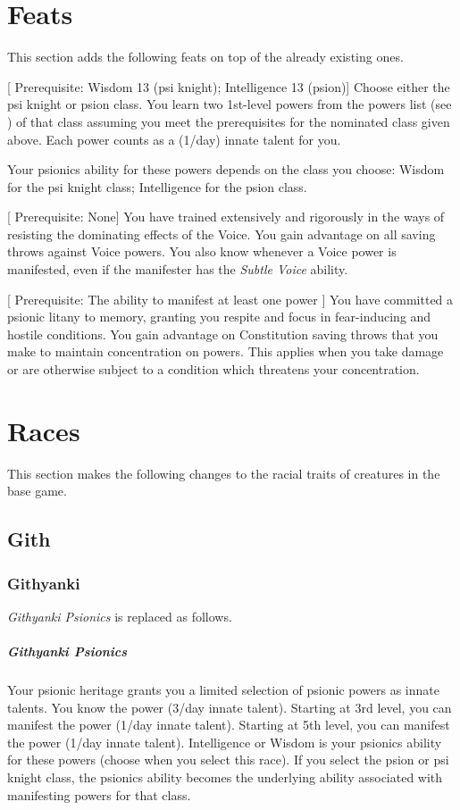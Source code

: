 \section{Feats}
\label{sec:feats}
This section adds the following feats on top of the already
existing ones.

[%
    Prerequisite: Wisdom 13 (psi knight); Intelligence 13 (psion)]
    Choose either the psi knight or psion class.
    You learn two 1st-level powers from the powers list
    (see )
    of that class assuming you meet the prerequisites
    for the nominated class given above.
    Each power counts as a (1/day) innate talent for you.

    Your psionics ability for these powers depends on the class
    you choose:
    Wisdom for the psi knight class; Intelligence for the psion class.

[%
    Prerequisite: None]
    You have trained extensively and rigorously in the ways
    of resisting the dominating effects of the Voice.
    You gain advantage on all saving throws against
    Voice powers.
    You also know whenever a Voice power is manifested,
    even if the manifester has the \emph{Subtle Voice} ability.

[%
    Prerequisite: The ability to manifest at least one power
]
You have committed a psionic litany to memory, granting you respite
and focus in fear-inducing and hostile conditions.
You gain advantage on Constitution saving throws that you make
to maintain concentration on powers.
This applies when you take damage
or are otherwise subject to a condition which
threatens your concentration.

\section{Races}
\label{sec:races}
This section makes the following changes to the racial traits
of creatures in the base game.

\subsection{Gith}
\subsubsection{Githyanki}
\emph{Githyanki Psionics} is replaced as follows.
\subparagraph{Githyanki Psionics}
    Your psionic heritage grants you a limited selection of
    psionic powers as innate talents.    
    You know the  power (3/day innate talent).
    Starting at 3rd level,
    you can manifest the  power (1/day innate talent).
    Starting at 5th level,
    you can manifest the  power (1/day innate talent).
    Intelligence or Wisdom is your psionics ability for these powers
    (choose when you select this race).
    If you select the psion or psi knight class,
    the psionics ability becomes the underlying ability
    associated with manifesting powers for that class.

